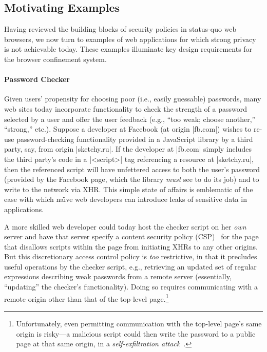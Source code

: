 
\subsection{Motivating Examples}
\label{sec:motivating-examples}

Having reviewed the building blocks of security policies in status-quo
web browsers, we now turn to examples of web applications for which
strong privacy is not achievable today. %
These examples
illuminate key design requirements for the \sys{} browser confinement
system. %

\paragraph{Password Checker} Given users' propensity for choosing poor
(i.e., easily guessable) passwords, many web sites today incorporate
functionality to check the strength of a password selected by a user
and offer the user feedback (e.g., ``too weak; choose another,''
``strong,'' etc.). Suppose a developer at Facebook (at origin
\js|fb.com|) wishes to re-use password-checking functionality provided
in a JavaScript library by a third party, say, from origin
\js|sketchy.ru|. If the developer at \js|fb.com| simply includes the
third party's code in a \js|<script>| tag referencing a resource at
\js|sketchy.ru|, then the referenced script will have unfettered
access to both the user's password (provided by the Facebook page,
which the library {\em must} see to do its job) and to write to the
network via XHR. This simple state of affairs is emblematic of the
ease with which na\"{\i}ve web developers can introduce leaks of
sensitive data in applications.

A more skilled web developer could today host the checker script on
her {\em own} server and have that server specify a content security
policy (CSP)~\cite{csp} for the page that disallows scripts within the
page from initiating XHRs to any other origins. But this discretionary
access control policy is {\em too} restrictive, in that it precludes
useful operations by the checker script, e.g., retrieving an updated
set of regular expressions describing weak passwords from a remote
server (essentially, ``updating'' the checker's functionality). Doing
so requires communicating with a remote origin other than that of the
top-level page.\footnote{Unfortunately, even permitting communication
  with the top-level page's same origin is risky---a malicious script
  could then write the password to a public page at that same origin,
  in a {\em self-exfiltration attack}~\cite{selfex}.}

